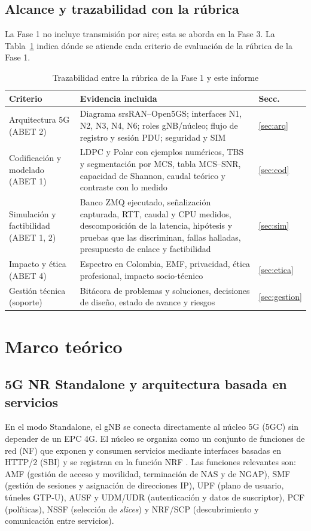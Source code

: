 \documentclass[conference]{IEEEtran}
\begin{document}
\subsection{Alcance y trazabilidad con la rúbrica}
La Fase 1 no incluye transmisión por aire; esta se aborda en la Fase 3. La Tabla~\ref{tab:trazabilidad} indica dónde se atiende cada criterio de evaluación de la rúbrica de la Fase 1.

\begin{table}[!t]
\caption{Trazabilidad entre la rúbrica de la Fase 1 y este informe}
\label{tab:trazabilidad}
\centering
\footnotesize
\renewcommand{\arraystretch}{1.15}
\begin{tabular}{p{2.5cm}p{4.7cm}p{0.8cm}}
\toprule
\textbf{Criterio} & \textbf{Evidencia incluida} & \textbf{Secc.} \\
\midrule
Arquitectura 5G (ABET 2) & Diagrama srsRAN--Open5GS; interfaces N1, N2, N3, N4, N6; roles gNB/núcleo; flujo de registro y sesión PDU; seguridad y SIM & \ref{sec:arq} \\
Codificación y modelado (ABET 1) & LDPC y Polar con ejemplos numéricos, TBS y segmentación por MCS, tabla MCS--SNR, capacidad de Shannon, caudal teórico y contraste con lo medido & \ref{sec:cod} \\
Simulación y factibilidad (ABET 1, 2) & Banco ZMQ ejecutado, señalización capturada, RTT, caudal y CPU medidos, descomposición de la latencia, hipótesis y pruebas que las discriminan, fallas halladas, presupuesto de enlace y factibilidad & \ref{sec:sim} \\
Impacto y ética (ABET 4) & Espectro en Colombia, EMF, privacidad, ética profesional, impacto socio-técnico & \ref{sec:etica} \\
Gestión técnica (soporte) & Bitácora de problemas y soluciones, decisiones de diseño, estado de avance y riesgos & \ref{sec:gestion} \\
\bottomrule
\end{tabular}
\end{table}

\section{Marco teórico}
\label{sec:marco}

\subsection{5G NR Standalone y arquitectura basada en servicios}
En el modo Standalone, el gNB se conecta directamente al núcleo 5G (5GC) sin depender de un EPC 4G. El núcleo se organiza como un conjunto de funciones de red (NF) que exponen y consumen servicios mediante interfaces basadas en HTTP/2 (SBI) y se registran en la función NRF \cite{ts23501,ts23502}. Las funciones relevantes son: AMF (gestión de acceso y movilidad, terminación de NAS y de NGAP), SMF (gestión de sesiones y asignación de direcciones IP), UPF (plano de usuario, túneles GTP-U), AUSF y UDM/UDR (autenticación y datos de suscriptor), PCF (políticas), NSSF (selección de \textit{slices}) y NRF/SCP (descubrimiento y comunicación entre servicios).
\end{document}
